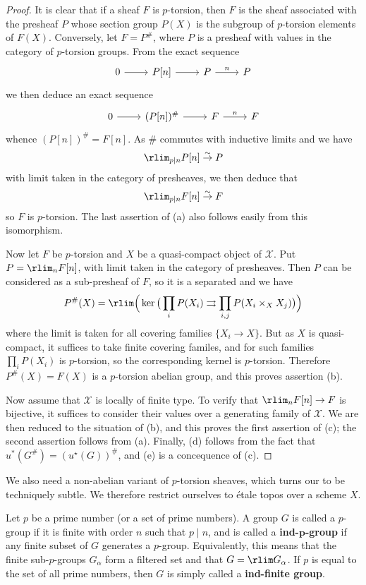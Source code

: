 \begin{proof}
It is clear that if a sheaf $F$ is $p$-torsion, then $F$ is the sheaf associated with the presheaf $P$ whose section group $P(X)$ is the subgroup of $p$-torsion elements of $F(X)$. Conversely, let $F=P^\#$, where $P$ is a presheaf with values in the category of $p$-torsion groups. From the exact sequence
\[\begin{tikzcd}
0\ar[r]&P[n]\ar[r]&P\ar[r,"n"]&P
\end{tikzcd}\]
we then deduce an exact sequence
\[\begin{tikzcd}
0\ar[r]&(P[n])^\#\ar[r]&F\ar[r,"n"]&F
\end{tikzcd}\]
whence $(P[n])^\#=F[n]$. As $\#$ commutes with inductive limits and we have
\[\rlim_{p\mid n}P[n]\stackrel{\sim}{\to} P\]
with limit taken in the category of presheaves, we then deduce that
\[\rlim_{p\mid n}F[n]\stackrel{\sim}{\to} F\]
so $F$ is $p$-torsion. The last assertion of (a) also follows easily from this isomorphism.\par
Now let $F$ be $p$-torsion and $X$ be a quasi-compact object of $\mathcal{X}$. Put $P=\rlim_nF[n]$, with limit taken in the category of presheaves. Then $P$ can be considered as a sub-presheaf of $F$, so it is a separated and we have
\[P^\#(X)=\rlim\Big(\ker\big(\prod_iP(X_i)\rightrightarrows \prod_{i,j}P(X_i\times_XX_j)\big)\Big)\]
where the limit is taken for all covering families $\{X_i\to X\}$. But as $X$ is quasi-compact, it suffices to take finite covering familes, and for such families $\prod_iP(X_i)$ is $p$-torsion, so the corresponding kernel is $p$-torsion. Therefore $P^\#(X)=F(X)$ is a $p$-torsion abelian group, and this proves assertion (b).\par
Now assume that $\mathcal{X}$ is locally of finite type. To verify that $\rlim_nF[n]\to F$ is bijective, it suffices to consider their values over a generating family of $\mathcal{X}$. We are then reduced to the situation of (b), and this proves the first assertion of (c); the second assertion follows from (a). Finally, (d) follows from the fact that $u^*(G^\#)=(u^\star(G))^\#$, and (e) is a concequence of (c).
\end{proof}

We also need a non-abelian variant of $p$-torsion sheaves, which turns our to be techniquely subtle. We therefore restrict ourselves to \'etale topos over a scheme $X$.

\begin{definition}
Let $p$ be a prime number (or a set of prime numbers). A group $G$ is called a $p$-group if it is finite with order $n$ such that $p\mid n$, and is called a \textbf{ind-$\bm{p}$-group} if any finite subset of $G$ generates a $p$-group. Equivalently, this means that the finite sub-$p$-groups $G_\alpha$ form a filtered set and that $G=\rlim G_\alpha$. If $p$ is equal to the set of all prime numbers, then $G$ is simply called a \textbf{ind-finite group}.
\end{definition}

